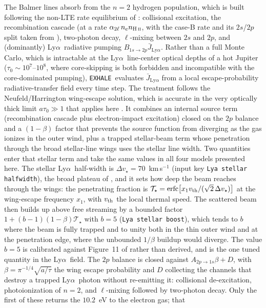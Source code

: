 \documentclass[twocolumn]{aastex702}
\newcommand{\EXHALE}{\texttt{EXHALE}}
\newcommand{\Lya}{\mbox{Ly}\ensuremath{\alpha}}
\begin{document}
The Balmer lines absorb from the $n=2$ hydrogen population, which is built following the
non-LTE rate equilibrium of \citet{Christie2013}: collisional excitation, the recombination
cascade (at a rate $\alpha_{2\ell}\,n_e n_{\rm H\,\textsc{ii}}$, with the case-B rate and
its $2s$/$2p$ split taken from \citealt{Draine2011}), two-photon decay,
$\ell$-mixing between $2s$ and $2p$, and (dominantly)
\Lya\ radiative pumping $B_{1s\to2p}\bar{J}_{\Lya}$. Rather than a full Monte Carlo, which
is intractable at the \Lya\ line-center optical depths of a hot Jupiter
($\tau_0\sim10^{7}$--$10^{8}$, where core-skipping is both forbidden and incompatible with
the core-dominated pumping), \EXHALE\ evaluates $\bar{J}_{\Lya}$ from a local
escape-probability radiative-transfer field every time step. The treatment follows the
Neufeld/Harrington wing-escape solution, which is accurate in the very optically thick
limit $a\tau_0\gg1$ that applies here \citep{Neufeld1990}. It combines an internal source
term (recombination cascade plus electron-impact excitation) closed on the $2p$ balance and
a $(1-\beta)$ factor that prevents the source function from diverging as the gas ionizes in
the outer wind, plus a trapped stellar-beam term whose penetration through the broad
stellar-line wings uses the stellar line width. Two quantities enter that stellar term and
take the same values in all four models presented here. The stellar \Lya\ half-width is
$\Delta v_\star=70$~km\,s$^{-1}$ (input key \texttt{Lya stellar halfwidth}), the broad
plateau of \citet{Huang2017}, and it sets how deep the beam reaches through the wings: the
penetrating fraction is $\mathcal{T}_\star=\mathrm{erfc}\!\left[x_1 v_{\rm th}/
(\sqrt{2}\,\Delta v_\star)\right]$ at the wing-escape frequency $x_1$, with $v_{\rm th}$
the local thermal speed. The scattered beam then builds up
above free streaming by a bounded factor $1+(b-1)(1-\beta)\mathcal{T}_\star$ with $b=5$
(\texttt{Lya stellar boost}), which tends to $b$ where the beam is fully trapped and to
unity both in the thin outer wind and at the penetration edge, where the unbounded $1/\beta$
buildup would diverge. The value $b=5$ is calibrated against Figure~11 of \citet{Huang2023}
rather than derived, and is the one tuned quantity in the \Lya\ field. The $2p$ balance is
closed against
$A_{2p\to1s}\beta + D$, with $\beta=\pi^{-1/4}\sqrt{a/\tau}$ the wing escape probability
and $D$ collecting the channels that destroy a trapped \Lya\ photon without re-emitting it:
collisional de-excitation, photoionization of $n=2$, and $\ell$-mixing followed by
two-photon decay. Only the first of these returns the $10.2$~eV to the electron gas; that
\end{document}

